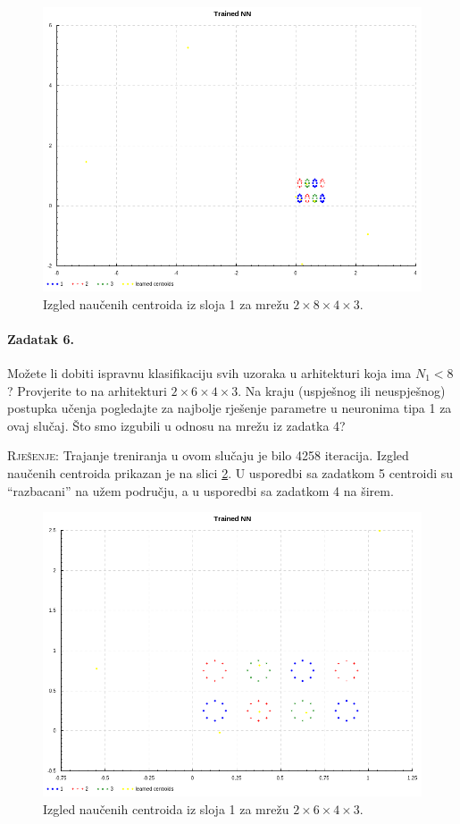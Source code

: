\documentclass[12pt, a4paper]{article}
\begin{document}
\begin{figure}[p]
  \centering
  \includegraphics[width=0.8\linewidth]{trained2.png}
  \caption{Izgled naučenih centroida iz sloja 1 za mrežu $2\times8\times4\times3$.}
  \label{fig:trained2}
\end{figure}

\paragraph{Zadatak 6.}
Možete li dobiti ispravnu klasifikaciju svih uzoraka u arhitekturi koja ima $N_1 < 8$?
Provjerite to na arhitekturi $2 \times 6 \times 4 \times 3$.
Na kraju (uspješnog ili neuspješnog) postupka učenja pogledajte za najbolje rješenje parametre u neuronima tipa 1 za ovaj slučaj.
Što smo izgubili u odnosu na mrežu iz zadatka 4?

\noindent\textsc{Rješenje:}
Trajanje treniranja u ovom slučaju je bilo 4258 iteracija.
Izgled naučenih centroida prikazan je na slici \ref{fig:trained3}.
U usporedbi sa zadatkom 5 centroidi su ``razbacani'' na užem području, a u usporedbi sa zadatkom 4 na širem.

\begin{figure}[p]
  \centering
  \includegraphics[width=0.8\linewidth]{trained3.png}
  \caption{Izgled naučenih centroida iz sloja 1 za mrežu $2\times6\times4\times3$.}
  \label{fig:trained3}
\end{figure}
\end{document}
